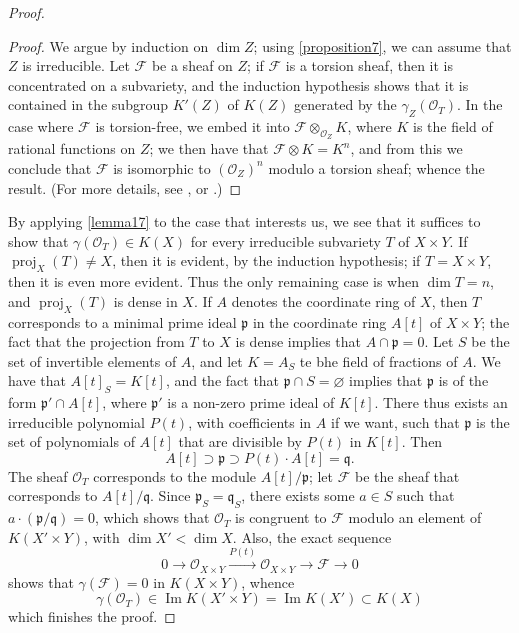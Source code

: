 \documentclass{article}
\theoremstyle{plain}
\theoremstyle{definition}
\newcommand{\sh}{\mathscr}
\DeclareMathOperator{\proj}{proj}
\begin{document}
\begin{proof}
  \begin{proof}
    We argue by induction on $\dim Z$;
    using \cref{proposition7}, we can assume that $Z$ is irreducible.
    Let $\sh{F}$ be a sheaf on $Z$;
    if $\sh{F}$ is a torsion sheaf, then it is concentrated on a subvariety, and the induction hypothesis shows that it is contained in the subgroup $K'(Z)$ of $K(Z)$ generated by the $\gamma_Z(\sh{O}_T)$.
    In the case where $\sh{F}$ is torsion-free, we embed it into $\sh{F}\otimes_{\sh{O}_Z}K$, where $K$ is the field of rational functions on $Z$;
    we then have that $\sh{F}\otimes K=K^n$, and from this we conclude that $\sh{F}$ is isomorphic to $(\sh{O}_Z)^n$ modulo a torsion sheaf;
    whence the result.
    (For more details, see \cite{14}, or \cite{6}.)
  \end{proof}

  By applying \cref{lemma17} to the case that interests us, we see that it suffices to show that $\gamma(\sh{O}_T)\in K(X)$ for every irreducible subvariety $T$ of $X\times Y$.
  If $\proj_X(T)\neq X$, then it is evident, by the induction hypothesis;
  if $T=X\times Y$, then it is even more evident.
  Thus the only remaining case is when $\dim T=n$, and $\proj_X(T)$ is dense in $X$.
  If $A$ denotes the coordinate ring of $X$, then $T$ corresponds to a minimal prime ideal $\mathfrak{p}$ in the coordinate ring $A[t]$ of $X\times Y$;
  the fact that the projection from $T$ to $X$ is dense implies that $A\cap\mathfrak{p}=0$.
  Let $S$ be the set of invertible elements of $A$, and let $K=A_S$ te bhe field of fractions of $A$.
  We have that $A[t]_S=K[t]$, and the fact that $\mathfrak{p}\cap S=\varnothing$ implies that $\mathfrak{p}$ is of the form $\mathfrak{p}'\cap A[t]$, where $\mathfrak{p}'$ is a non-zero prime ideal of $K[t]$.
  There thus exists an irreducible polynomial $P(t)$, with coefficients in $A$ if we want, such that $\mathfrak{p}$ is the set of polynomials of $A[t]$ that are divisible by $P(t)$ in $K[t]$.
  Then
  \[
    A[t] \supset \mathfrak{p} \supset P(t)\cdot A[t] = \mathfrak{q}.
  \]
  The sheaf $\sh{O}_T$ corresponds to the module $A[t]/\mathfrak{p}$;
  let $\sh{F}$ be the sheaf that corresponds to $A[t]/\mathfrak{q}$.
  Since $\mathfrak{p}_S=\mathfrak{q}_S$, there exists some $a\in S$ such that $a\cdot(\mathfrak{p}/\mathfrak{q})=0$, which shows that $\sh{O}_T$ is congruent to $\sh{F}$ modulo an element of $K(X'\times Y)$, with $\dim X'<\dim X$.
  Also, the exact sequence
  \[
    0 \to \sh{O}_{X\times Y} \xrightarrow{P(t)} \sh{O}_{X\times Y} \to \sh{F} \to 0
  \]
  shows that $\gamma(\sh{F})=0$ in $K(X\times Y)$, whence
  \[
    \gamma(\sh{O}_T) \in \operatorname{Im} K(X'\times Y) = \operatorname{Im} K(X') \subset K(X)
  \]
  which finishes the proof.
\end{proof}
\end{document}
